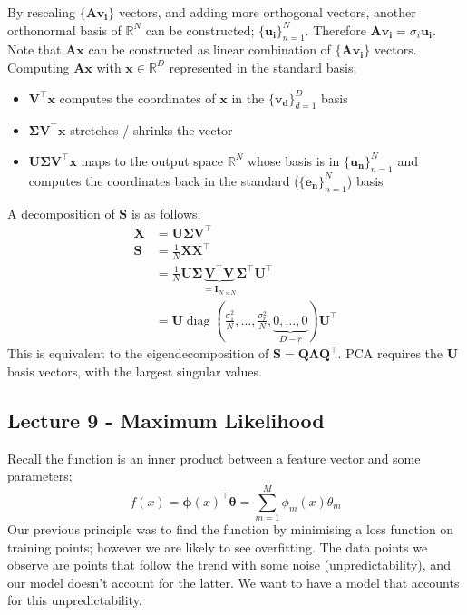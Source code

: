 \documentclass[a4paper, 12pt]{article}
\newcommand{\summation}[2]{\sum\limits_{#1}^{#2}}
\newcommand{\mat}[1]{\boldsymbol{#1}}
\renewcommand{\vec}[1]{\boldsymbol{#1}}
\newcommand{\mbbr}[0]{\mathbb{R}}
\DeclareMathOperator*{\diag}{diag}
\begin{document}
                By rescaling $\{ \mat{A}\vec{v_i} \}$ vectors, and adding more orthogonal vectors, another orthonormal basis of $\mbbr^N$ can be constructed; $\{ \vec{u_i} \}_{n = 1}^N$.
                Therefore $\mat{A}\mat{v_i} = \sigma_i\mat{u_i}$.
                Note that $\mat{A}\mat{x}$ can be constructed as linear combination of $\{ \mat{A}\vec{v_i} \}$ vectors.
                Computing $\mat{A}\mat{x}$ with $\mat{x} \in \mbbr^D$ represented in the standard basis;
                \begin{itemize}
                    \itemsep0em
                    \item $\mat{V}^\top\mat{x}$ computes the coordinates of $\mat{x}$ in the $\{ \mat{v_d} \}_{d = 1}^D$ basis
                    \item $\mat{\Sigma}\mat{V}^\top\mat{x}$ stretches / shrinks the vector
                    \item $\mat{U}\mat{\Sigma}\mat{V}^\top\mat{x}$ maps to the output space $\mbbr^N$ whose basis is in $\{ \vec{u_n} \}_{n = 1}^N$ and computes the coordinates back in the standard ($\{ \vec{e_n} \}_{n = 1}^N$) basis
                \end{itemize}
                A decomposition of $\mat{S}$ is as follows;
                \begin{align*}
                    \mat{X} & = \mat{U} \mat{\Sigma} \mat{V}^\top \\
                    \mat{S} & = \frac{1}{N} \mat{X}\mat{X}^\top \\
                    & = \frac{1}{N} \mat{U} \mat{\Sigma} \underbrace{\mat{V}^\top \mat{V}}_{= \mat{I}_{N \times N}} \mat{\Sigma}^\top \mat{U}^\top \\
                    & = \mat{U} \diag(\frac{\sigma_1^2}{N}, \dots, \frac{\sigma_r^2}{N}, \underbrace{0, \dots, 0}_{D - r}) \mat{U}^\top
                \end{align*}
                This is equivalent to the eigendecomposition of $\mat{S} = \mat{Q}\mat{\Lambda}\mat{Q}^\top$.
                PCA requires the $\mat{U}$ basis vectors, with the largest singular values.
        \subsection*{Lecture 9 - Maximum Likelihood}
            Recall the function is an inner product between a feature vector and some parameters;
            $$f(x) = \vec{\phi}(x)^\top \vec{\theta} = \summation{m = 1}{M} \phi_m(x) \theta_m$$
            Our previous principle was to find the function by minimising a loss function on training points; however we are likely to see overfitting.
            The data points we observe are points that follow the trend with some noise (unpredictability), and our model doesn't account for the latter.
            We want to have a model that accounts for this unpredictability.
            \medskip
\end{document}
